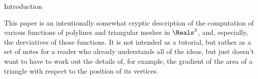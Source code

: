 \begin{plSection}{Introduction}
\label{sec:Introduction}

This paper is an intentionally somewhat cryptic description
of the computation of various functions of polylines
and triangular meshes in $\Reals^3$,
and, especially, the derviatives of those functions.
It is not intended as a tutorial,
but rather as a set of notes for a reader who
already understands all of the ideas,
but just doesn't want to have to work out the
details of, for example, the gradient of the
area of a triangle with respect 
to the position of its vertices.

\end{plSection}%
